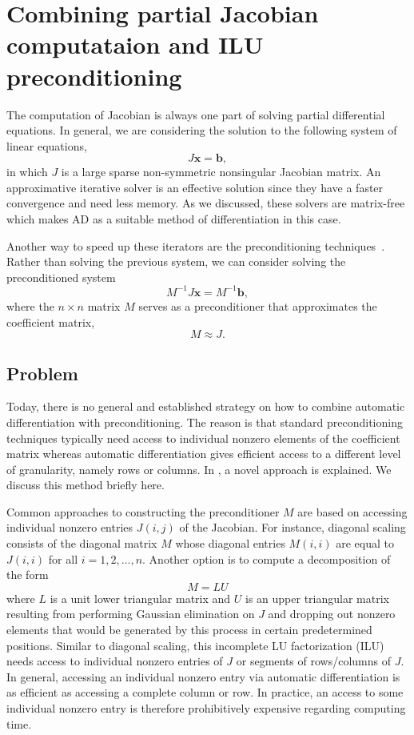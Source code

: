 \documentclass[12pt, twoside,a4paper,toc=bibliography]{scrbook}
\newcommand{\vek}[1]{{\ensuremath{\mathbf #1}}}
\begin{document}
\section{Combining partial Jacobian computataion and ILU preconditioning}
\label{s.precond}
The computation of Jacobian is always one part of solving partial differential equations.
In general, we are considering the solution to the following system of linear equations,
$$
J\vek{x} = \vek{b},
$$
in which $J$ is a large sparse non-symmetric nonsingular Jacobian matrix. An approximative iterative solver is an
effective solution since they have a faster convergence and need less memory. As we discussed,
these solvers are matrix-free which makes AD as a suitable method of differentiation in this case.

Another way to speed up these iterators are
the preconditioning techniques~\cite{precond1,precond2}.
Rather than solving the previous system,
we can consider solving the preconditioned system
\begin{equation}
\label{e:precond}
M^{-1} J \vek{x}= M^{-1}\vek{b},
\end{equation}
where the $n \times n$ matrix $M$ serves as a preconditioner that approximates
the coefficient matrix,
$$M \approx J.$$

\subsection{Problem}
\label{ss.problem.precond}
Today, there is no general and established
strategy on how to combine automatic differentiation with preconditioning. The reason is
that standard preconditioning techniques typically need access to individual nonzero
elements of the coefficient matrix whereas automatic differentiation gives efficient
access to a different level of granularity, namely rows or columns.
In \cite{Lulfesmann2012Fap}, a novel approach is explained.
We discuss this method briefly here.

Common approaches to constructing the preconditioner $M$ are based on accessing individual
nonzero entries $J(i,j)$ of the Jacobian. For instance, diagonal scaling consists of the
diagonal matrix $M$ whose diagonal entries $M(i,i)$ are equal to $J(i,i)$ for all
$i=1,2,\dots, n$. Another option is to compute a decomposition of the form
$$M = LU$$
where $L$ is a unit lower triangular matrix and $U$ is an upper triangular matrix
resulting from performing Gaussian elimination on $J$ and dropping out nonzero elements
that would be generated by this process in certain predetermined positions. Similar to
diagonal scaling, this incomplete LU factorization (ILU) needs access to individual
nonzero entries of $J$ or segments of rows/columns of $J$. In general, accessing an
individual nonzero entry via automatic differentiation is as efficient as accessing a
complete column or row. In practice, an access to some individual nonzero entry is
therefore prohibitively expensive regarding computing time.
\end{document}
